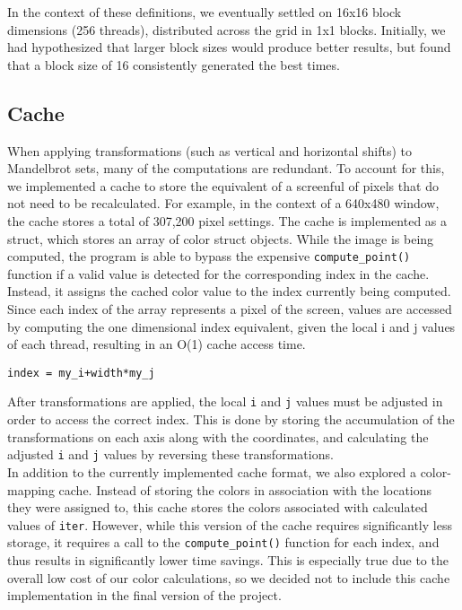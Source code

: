 \documentclass{article}
\begin{document}
In the context of these definitions, we eventually settled on 16x16 block dimensions (256 threads), distributed across the grid in 1x1 blocks.
Initially, we had hypothesized that larger block sizes would produce better results, but found that a block size of 16 consistently generated the best times.

\subsection{Cache}

When applying transformations (such as vertical and horizontal shifts) to Mandelbrot sets, many of the computations are redundant.
To account for this, we implemented a cache to store the equivalent of a screenful of pixels that do not need to be recalculated.
For example, in the context of a 640x480 window, the cache stores a total of 307,200 pixel settings.
The cache is implemented as a struct, which stores an array of color struct objects.
While the image is being computed, the program is able to bypass the expensive \verb|compute_point()| function if a valid value is detected for the corresponding index in the cache.
Instead, it assigns the cached color value to the index currently being computed.
Since each index of the array represents a pixel of the screen, values are accessed by computing the one dimensional index equivalent, given the local i and j values of each thread, resulting in an O(1) cache access time.

\begin{verbatim}
index = my_i+width*my_j
\end{verbatim}

After transformations are applied, the local \verb|i| and \verb|j| values must be adjusted in order to access the correct index.
This is done by storing the accumulation of the transformations on each axis along with the coordinates, and calculating the adjusted \verb|i| and \verb|j| values by reversing these transformations.\\

In addition to the currently implemented cache format, we also explored a color-mapping cache.
Instead of storing the colors in association with the locations they were assigned to, this cache stores the colors associated with calculated values of \verb|iter|.
However, while this version of the cache requires significantly less storage, it requires a call to the \verb|compute_point()| function for each index, and thus results in significantly lower time savings.
This is especially true due to the overall low cost of our color calculations, so we decided not to include this cache implementation in the final version of the project.
\end{document}
